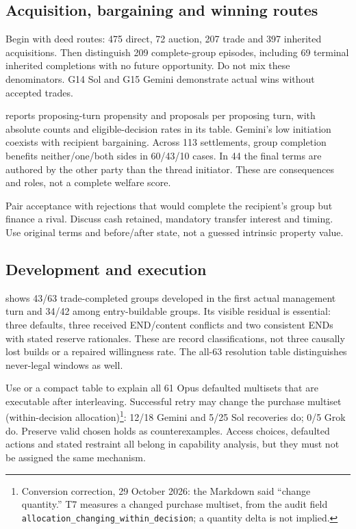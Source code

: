 \subsection{Acquisition, bargaining and winning routes}
Begin with deed routes: 475 direct, 72 auction, 207 trade and 397 inherited acquisitions. Then distinguish 209 complete-group episodes, including 69 terminal inherited completions with no future opportunity. Do not mix these denominators. G14 Sol and G15 Gemini demonstrate actual wins without accepted trades.

 reports proposing-turn propensity and proposals per proposing turn, with absolute counts and eligible-decision rates in its table. Gemini's low initiation coexists with recipient bargaining. Across 113 settlements, group completion benefits neither/one/both sides in 60/43/10 cases. In 44 the final terms are authored by the other party than the thread initiator. These are consequences and roles, not a complete welfare score.

Pair acceptance with rejections that would complete the recipient's group but finance a rival. Discuss cash retained, mandatory transfer interest and timing. Use original terms and before/after state, not a guessed intrinsic property value.

\subsection{Development and execution}
 shows 43/63 trade-completed groups developed in the first actual management turn and 34/42 among entry-buildable groups. Its visible residual is essential: three defaults, three received END/content conflicts and two consistent ENDs with stated reserve rationales. These are record classifications, not three causally lost builds or a repaired willingness rate. The all-63 resolution table distinguishes never-legal windows as well.

Use  or a compact table to explain all 61 Opus defaulted multisets that are executable after interleaving. Successful retry may change the purchase multiset (within-decision allocation)\footnote{Conversion correction, 29 October 2026: the Markdown said ``change quantity.'' T7 measures a changed purchase multiset, from the audit field \texttt{allocation\_changing\_within\_decision}; a quantity delta is not implied.}: 12/18 Gemini and 5/25 Sol recoveries do; 0/5 Grok do. Preserve valid chosen holds as counterexamples. Access choices, defaulted actions and stated restraint all belong in capability analysis, but they must not be assigned the same mechanism.

